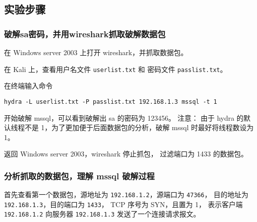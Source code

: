 \subsection{实验步骤}
\subsubsection{破解sa密码，并用wireshark抓取破解数据包}
在 Windows server 2003 上打开 wireshark，并抓取数据包。

在 Kali 上，查看用户名文件 \texttt{userlist.txt} 和
密码文件 \texttt{passlist.txt}。

在终端输入命令
\begin{verbatim}
hydra -L userlist.txt -P passlist.txt 192.168.1.3 mssql -t 1
\end{verbatim}
开始破解 mssql，可以看到破解出 sa 的密码为 123456。
注意：
由于 hydra 的默认线程不是 1，为了更加便于后面数据包的分析，破解 mssql
时最好将线程数设为 1。

返回 Windows server 2003，wireshark 停止抓包，
过滤端口为 1433 的数据包。
%
\subsubsection{分析抓取的数据包，理解 mssql 破解过程}
首先查看第一个数据包，源地址为 \texttt{192.168.1.2}，源端口为 \texttt{47366}，
目的地址为 \texttt{192.168.1.3}，目的端口为 \texttt{1433}，
TCP 序号为 SYN，且置为 1，
表示客户端 \texttt{192.168.1.2} 向服务器 \texttt{192.168.1.3} 发送了一个连接请求报文。

